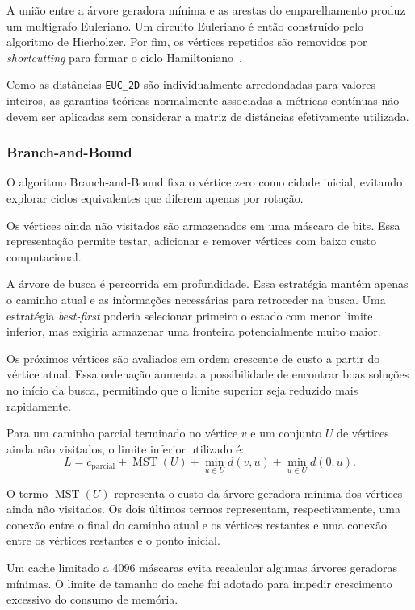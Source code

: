\documentclass[12pt]{article}
\begin{document}
A união entre a árvore geradora mínima e as arestas do emparelhamento produz um multigrafo Euleriano. Um circuito Euleriano é então construído pelo algoritmo de Hierholzer. Por fim, os vértices repetidos são removidos por \emph{shortcutting} para formar o ciclo Hamiltoniano~\cite{christofides}.

Como as distâncias \texttt{EUC\_2D} são individualmente arredondadas para valores inteiros, as garantias teóricas normalmente associadas a métricas contínuas não devem ser aplicadas sem considerar a matriz de distâncias efetivamente utilizada.

\subsubsection{Branch-and-Bound}

O algoritmo Branch-and-Bound fixa o vértice zero como cidade inicial, evitando explorar ciclos equivalentes que diferem apenas por rotação.

Os vértices ainda não visitados são armazenados em uma máscara de bits. Essa representação permite testar, adicionar e remover vértices com baixo custo computacional.

A árvore de busca é percorrida em profundidade. Essa estratégia mantém apenas o caminho atual e as informações necessárias para retroceder na busca. Uma estratégia \emph{best-first} poderia selecionar primeiro o estado com menor limite inferior, mas exigiria armazenar uma fronteira potencialmente muito maior.

Os próximos vértices são avaliados em ordem crescente de custo a partir do vértice atual. Essa ordenação aumenta a possibilidade de encontrar boas soluções no início da busca, permitindo que o limite superior seja reduzido mais rapidamente.

Para um caminho parcial terminado no vértice $v$ e um conjunto $U$ de vértices ainda não visitados, o limite inferior utilizado é:
\begin{equation}
 L = c_{\mathrm{parcial}} + \operatorname{MST}(U)
     + \min_{u\in U} d(v,u) + \min_{u\in U} d(0,u).
\end{equation}

O termo $\operatorname{MST}(U)$ representa o custo da árvore geradora mínima dos vértices ainda não visitados. Os dois últimos termos representam, respectivamente, uma conexão entre o final do caminho atual e os vértices restantes e uma conexão entre os vértices restantes e o ponto inicial.

Um cache limitado a 4096 máscaras evita recalcular algumas árvores geradoras mínimas. O limite de tamanho do cache foi adotado para impedir crescimento excessivo do consumo de memória.
\end{document}
